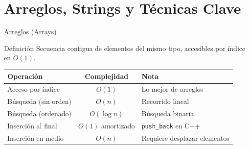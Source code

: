 \documentclass[aspectratio=169]{beamer}
\begin{document}
\section{Arreglos, Strings y Técnicas Clave}
\begin{frame}{Arreglos (Arrays)}
    \begin{block}{Definición}
        Secuencia contigua de elementos del mismo tipo, accesibles por índice en $O(1)$.
    \end{block}
    
    \centering
    
    \vspace{0.3cm}
    \begin{table}[]
        \centering
        \scriptsize
        \renewcommand{\arraystretch}{1.2}
        \begin{tabular}{l c l}
            \toprule
            \textbf{Operación} & \textbf{Complejidad} & \textbf{Nota} \\
            \midrule
            Acceso por índice & $O(1)$ & Lo mejor de arreglos \\
            Búsqueda (sin orden) & $O(n)$ & Recorrido lineal \\
            Búsqueda (ordenado) & $O(\log n)$ & Búsqueda binaria \\
            Inserción al final & $O(1)$ amortizado & \texttt{push\_back} en C++ \\
            Inserción en medio & $O(n)$ & Requiere desplazar elementos \\
            \bottomrule
        \end{tabular}
    \end{table}
\end{frame}
\end{document}
